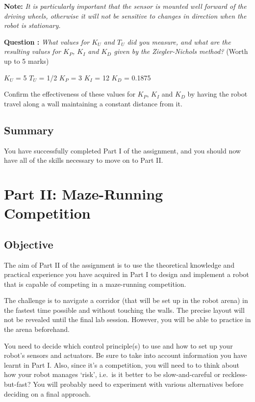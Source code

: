 \documentclass[hidelinks,a4paper,11pt]{article}
\newcounter{question}
\newcommand\myq{\refstepcounter{question}\thequestion}
\begin{document}
{\bfseries Note:}  \emph{It is particularly important that the sensor is mounted well forward of the driving wheels, otherwise it will not be sensitive to changes in direction when the robot is stationary.}

{\bfseries Question \myq:}  \emph{What values for $K_U$ and $T_U$ did you measure, and what are the resulting values for $K_P$, $K_I$ and $K_D$  given by the Ziegler-Nichols method?} (Worth up to 5 marks)\\
\begin{mdframed}
$K_U$ = 5
$T_U$ = 1/2
$K_P$ = 3
$K_I$  = 12
$K_D$  = 0.1875
\end{mdframed}
\vspace*{\baselineskip}

\begin{todolist}
	\item Confirm the effectiveness of these values for $K_P$, $K_I$ and $K_D$ by having the robot travel along a wall maintaining a constant distance from it.
 \end{todolist}


\subsection{Summary}

You have successfully completed Part I of the assignment, and you should now have all of the skills necessary to move on to Part II.


\newpage
\section{Part II: Maze-Running Competition}

\subsection{Objective}

The aim of Part II of the assignment is to use the theoretical knowledge and practical experience you have acquired in Part I to design and implement a robot that is capable of competing in a maze-running competition.

The challenge is to navigate a corridor (that will be set up in the robot arena) in the fastest time possible and without touching the walls.  The precise layout will not be revealed until the final lab session.  However, you will be able to practice in the arena beforehand.

You need to decide which control principle(s) to use and how to set up your robot's sensors and actuators.  Be sure to take into account information you have learnt in Part I.  Also, since it's a competition, you will need to to think about how your robot manages `risk', i.e.\ is it better to be slow-and-careful or reckless-but-fast?  You will probably need to experiment with various alternatives before deciding on a final approach.
\end{document}
